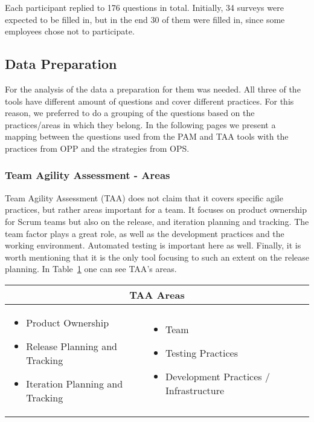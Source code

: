 Each participant replied to 176 questions in total. Initially, 34 surveys were expected to be filled in, but in the end 30 of them were filled in, since some employees chose not to participate.

\subsection{Data Preparation}
\label{subsec:data_preparation}
For the analysis of the data a preparation for them was needed. All three of the tools have different amount of questions and cover different practices. For this reason, we preferred to do a grouping of the questions based on the practices/areas in which they belong. In the following pages we present a mapping between the questions used from the \ac{PAM} and \ac{TAA} tools with the practices from \ac{OPP} and the strategies from \ac{OPS}.

\subsubsection[\ac{TAA} Areas]{Team Agility Assessment - Areas}
Team Agility Assessment (\ac{TAA}) does not claim that it covers specific agile practices, but rather areas important for a team. It focuses on product ownership for Scrum teams but also on the release, and iteration planning and tracking. The team factor plays a great role, as well as the development practices and the working environment. Automated testing is important here as well. Finally, it is worth mentioning that it is the only tool focusing to such an extent on the release planning. In Table~\ref{table:taa_practices} one can see \ac{TAA}'s areas.

\begin{table}
  \begin{tabular}{| p{5cm} p{5cm} |}
    \hline
    \multicolumn{2}{|c|}{\textbf{\ac{TAA} Areas}}  \\ \hline
     \begin{itemize} \item Product Ownership \item Release Planning and Tracking \item Iteration Planning and Tracking \end{itemize} &
     \begin{itemize}  \item Team \item Testing Practices \item Development Practices / Infrastructure \end{itemize}  \\ \hline
  \end{tabular}
  \label{table:taa_practices}
\end{table}

